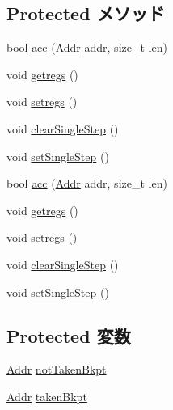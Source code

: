 \subsection*{Protected メソッド}
\begin{DoxyCompactItemize}
\item 
bool \hyperlink{classMipsISA_1_1RemoteGDB_ac4c7be164f087f2f53d137d9768809a7}{acc} (\hyperlink{classm5_1_1params_1_1Addr}{Addr} addr, size\_\-t len)
\item 
void \hyperlink{classMipsISA_1_1RemoteGDB_a62bc8adc5a48f1cbb5eb9bb64301d38d}{getregs} ()
\item 
void \hyperlink{classMipsISA_1_1RemoteGDB_a2051121b6bc93c8ca3856bbeeca7bdc1}{setregs} ()
\item 
void \hyperlink{classMipsISA_1_1RemoteGDB_afd89268069d9026378b06b08c97f65f8}{clearSingleStep} ()
\item 
void \hyperlink{classMipsISA_1_1RemoteGDB_a40d5da340fdb741de8cd3ffbc69708fe}{setSingleStep} ()
\item 
bool \hyperlink{classMipsISA_1_1RemoteGDB_ac4c7be164f087f2f53d137d9768809a7}{acc} (\hyperlink{classm5_1_1params_1_1Addr}{Addr} addr, size\_\-t len)
\item 
void \hyperlink{classMipsISA_1_1RemoteGDB_a62bc8adc5a48f1cbb5eb9bb64301d38d}{getregs} ()
\item 
void \hyperlink{classMipsISA_1_1RemoteGDB_a2051121b6bc93c8ca3856bbeeca7bdc1}{setregs} ()
\item 
void \hyperlink{classMipsISA_1_1RemoteGDB_afd89268069d9026378b06b08c97f65f8}{clearSingleStep} ()
\item 
void \hyperlink{classMipsISA_1_1RemoteGDB_a40d5da340fdb741de8cd3ffbc69708fe}{setSingleStep} ()
\end{DoxyCompactItemize}
\subsection*{Protected 変数}
\begin{DoxyCompactItemize}
\item 
\hyperlink{classm5_1_1params_1_1Addr}{Addr} \hyperlink{classMipsISA_1_1RemoteGDB_ae1a0a563a724aaffa8ae5b4095957aa4}{notTakenBkpt}
\item 
\hyperlink{classm5_1_1params_1_1Addr}{Addr} \hyperlink{classMipsISA_1_1RemoteGDB_abfdbe67e311a613bbbe39b730279f3e1}{takenBkpt}
\end{DoxyCompactItemize}

